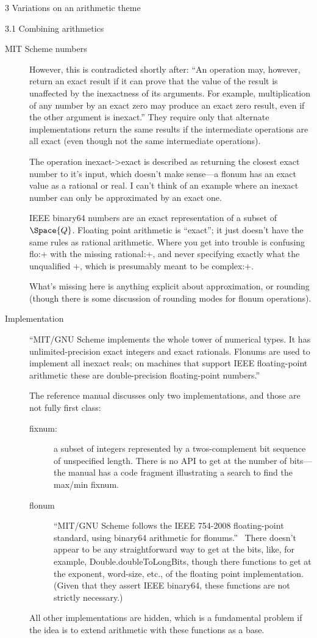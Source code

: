 \documentclass[12pt]{PalisadesLakesBook}
\begin{document}
\begin{plSection}{3 Variations on an arithmetic theme}
\begin{plSection}{3.1 Combining arithmetics}
\begin{plSection}{MIT Scheme numbers}
\begin{description}
However, this is contradicted shortly after:
``An operation may, however,
return an exact result if it can prove that the value of the 
result is unaffected by the inexactness of its arguments. 
For example, multiplication of any number by an exact zero
may produce an exact zero result, even if the other argument 
is inexact.''
They require only 
that alternate implementations return the same results
if the intermediate operations are all exact
(even though not the same intermediate operations).

The operation {\schemeFont inexact->exact} is described
as returning the closest exact number to it's input,
which doesn't make sense---a {\schemeFont flonum} has
an exact value as a rational or real.
I can't think of an example where an inexact number can only
be approximated by an exact one.

IEEE binary64 numbers are an exact representation of a subset of
$\Space{Q}$. 
Floating point arithmetic is ``exact'';
it just doesn't have the same rules as rational arithmetic.
Where you get into trouble is confusing  
{\schemeFont flo:+} with the missing {\schemeFont rational:+},
and never specifying exactly what the unqualified 
{\schemeFont +}, which is presumably meant to be
{\schemeFont complex:+}.

What's missing here is anything explicit about approximation,
or rounding (though there is some discussion of rounding modes
for {\schemeFont flonum} operations).

\item[Implementation]
``MIT/GNU Scheme implements the whole tower of numerical types. 
It has unlimited-precision exact
integers and exact rationals. 
Flonums are used to implement all inexact reals; 
on machines that support IEEE floating-point arithmetic 
these are double-precision floating-point 
numbers.''~\cite[chapter 4, footnote 1]{Hanson:2020:MITSchemeRef}

The reference manual discusses only two implementations,
and those are not fully first class:
\begin{description}
\item[fixnum:] a subset of integers
represented by a twos-complement bit sequence 
of unspecified length.
There is no API to get at the number of bits---the manual
has a code fragment illustrating a search to find the max/min
fixnum.
\item[flonum] ``MIT/GNU Scheme follows the IEEE 754-2008 
floating-point standard, using binary64
arithmetic for 
flonums.''~\cite[section 4.7.2]{Hanson:2020:MITSchemeRef}
There doesn't appear to be any straightforward way to get
at the bits, like, for example, 
{\javaFont Double.doubleToLongBits},
though there functions to get at the exponent, word-size, etc.,
of the floating point implementation. 
(Given that they assert IEEE binary64, 
these functions are not strictly necessary.)
\end{description}
All other implementations are hidden, 
which is a fundamental problem if the idea is to extend arithmetic
with these functions as a base.


\end{description}
\end{plSection}
\end{plSection}
\end{plSection}
\end{document}
